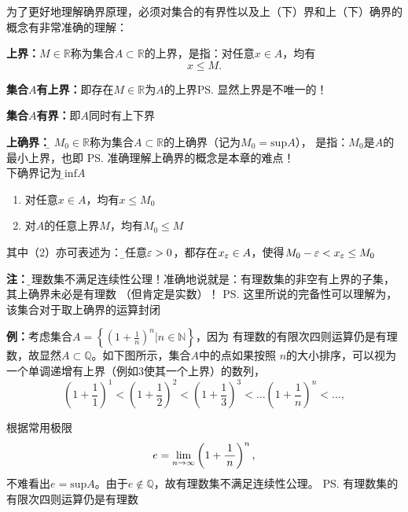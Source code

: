 	为了更好地理解确界原理，必须对集合的有界性以及上（下）界和上（下）确界的概念有非常准确的理解：
	
	{\bf 上界：}$M\in\mathbb{R}$称为集合$A\subset\mathbb{R}$的上界，是指：对任意$x\in A$，均有
	$$x\leq M.$$
	
	{\bf 集合$A$有上界：}即存在$M\in\mathbb{R}$为$A$的上界\ps{显然上界是不唯一的！}
	
	{\bf 集合$A$有界：}即$A$同时有上下界
	
	{\bf 上确界：}{\b
	$M_0\in\mathbb{R}$称为集合$A\subset\mathbb{R}$的上确界（记为$M_0=\mathrm{sup}A$），
	是指：$M_0$是$A$的最小上界}，也即
	\ps{准确理解上确界的概念是本章的难点！\\
	下确界记为：\b$\mathrm{inf}A$}
	\begin{enumerate}[(1)]
	  \setlength{\itemindent}{1cm}
	  \item 对任意$x\in A$，均有$x\leq M_0$
	  \item 对$A$的任意上界$M$，均有$M_0\leq M$
	\end{enumerate}
	其中（2）亦可表述为：{\b 对任意$\varepsilon>0$，都存在$x_{\varepsilon}\in A$，使得$M_0-\varepsilon<x_{\varepsilon}\leq M_0$}
	
	{\bf 注：}{\b 有理数集不满足连续性公理！}准确地说就是：有理数集的非空有上界的子集，
	其上确界未必是有理数	（但肯定是实数）！
	\ps{这里所说的完备性可以理解为，该集合对于取上确界的运算封闭}
	
	{\bf 例：}考虑集合$A=\left\{\left(1+\frac 1n\right)^n|n\in\mathbb{N}\right\}$，因为
	有理数的有限次四则运算仍是有理数，故显然$A\subset\mathbb{Q}$。如下图所示，集合$A$中的点如果按照
	$n$的大小排序，可以视为一个单调递增有上界（例如$3$使其一个上界）的数列，
	$$\left(1+\frac11\right)^1<\left(1+\frac12\right)^2<\left(1+\frac13\right)^3<\ldots
	\left(1+\frac1n\right)^n<\ldots,$$
	\begin{center}
	\end{center}
	根据常用极限
	$$e=\lim\limits_{n\to\infty}\left(1+\displaystyle\frac{\,{1}\,}{\,{n}\,}\right)^n,$$
	不难看出$e=\mathrm{sup}A$。由于$e\notin\mathbb{Q}$，故有理数集不满足连续性公理。
	\ps{有理数集的有限次四则运算仍是有理数}
	
